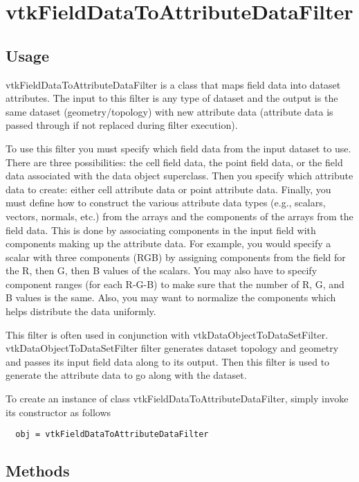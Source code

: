 \section{vtkFieldDataToAttributeDataFilter}

\subsection{Usage}

 vtkFieldDataToAttributeDataFilter is a class that maps field data into
 dataset attributes. The input to this filter is any type of dataset and
 the output is the same dataset (geometry/topology) with new attribute data
 (attribute data is passed through if not replaced during filter
 execution).

 To use this filter you must specify which field data from the input
 dataset to use. There are three possibilities: the cell field data, the
 point field data, or the field data associated with the data object
 superclass. Then you specify which attribute data to create: either cell
 attribute data or point attribute data.  Finally, you must define how to
 construct the various attribute data types (e.g., scalars, vectors,
 normals, etc.) from the arrays and the components of the arrays from the
 field data. This is done by associating components in the input field with
 components making up the attribute data. For example, you would specify a
 scalar with three components (RGB) by assigning components from the field
 for the R, then G, then B values of the scalars.  You may also have to
 specify component ranges (for each R-G-B) to make sure that the number of
 R, G, and B values is the same. Also, you may want to normalize the
 components which helps distribute the data uniformly.

 This filter is often used in conjunction with
 vtkDataObjectToDataSetFilter.  vtkDataObjectToDataSetFilter filter
 generates dataset topology and geometry and passes its input field data
 along to its output. Then this filter is used to generate the attribute
 data to go along with the dataset.

To create an instance of class vtkFieldDataToAttributeDataFilter, simply
invoke its constructor as follows
\begin{verbatim}
  obj = vtkFieldDataToAttributeDataFilter
\end{verbatim}
\subsection{Methods}

